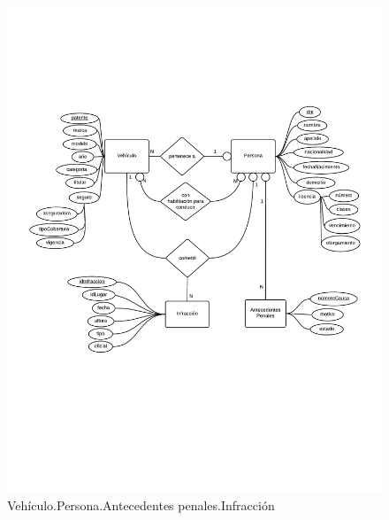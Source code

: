 \begin{figure}
  \begin{center}
    \includegraphics[scale=0.8]{diagramas/2-2.pdf}
    \caption{Vehículo.Persona.Antecedentes penales.Infracción}
  \end{center}
\end{figure}

